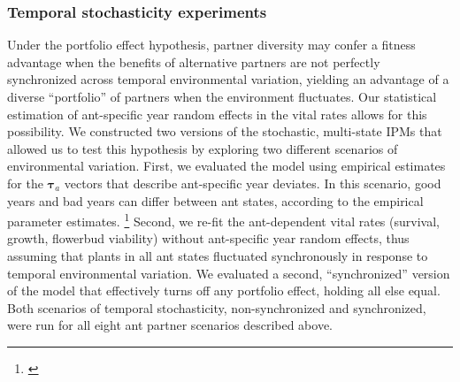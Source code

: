 \documentclass[11pt]{article}
\newcommand{\tom}[2]{{\color{red}{#1}}\footnote{\textit{\color{red}{#2}}}}
\begin{document}
\subsubsection*{Temporal stochasticity experiments}
Under the portfolio effect hypothesis, partner diversity may confer a fitness advantage when the benefits of alternative partners are not perfectly synchronized across temporal environmental variation, yielding an advantage of a diverse ``portfolio'' of partners when the environment fluctuates. 
Our statistical estimation of ant-specific year random effects in the vital rates allows for this possibility. 
We constructed two versions of the stochastic, multi-state IPMs that allowed us to test this hypothesis by exploring two different scenarios of environmental variation. 
First, we evaluated the model using empirical estimates for the $\pmb{\tau}_{a}$ vectors that describe ant-specific year deviates. 
In this scenario, good years and bad years can differ between ant states, according to the empirical parameter estimates. 
\tom{We also quantified from the fitted random effects how tightly inter-annual variation was correlated between ant states.}{Worth doing!} 
Second, we re-fit the ant-dependent vital rates (survival, growth, flowerbud viability) without ant-specific year random effects, thus assuming that plants in all ant states fluctuated synchronously in response to temporal environmental variation. 
We evaluated a second, ``synchronized'' version of the model that effectively turns off any portfolio effect, holding all else equal. 
Both scenarios of temporal stochasticity, non-synchronized and synchronized, were run for all eight ant partner scenarios described above. 
\end{document}
